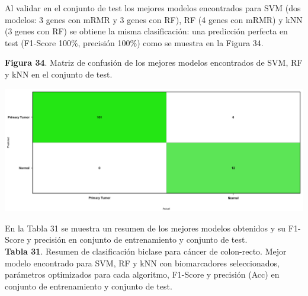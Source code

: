 Al validar en el conjunto de test los mejores modelos encontrados para SVM (dos modelos: 3 genes con mRMR y 3 genes con RF), RF (4 genes con mRMR) y kNN (3 genes con RF) se obtiene la misma clasificación: una predicción perfecta en test (F1-Score 100\%, precisión 100\%) como se muestra en la Figura 34.\\

\newpage
\begin{center}
\textbf{Figura 34}. Matriz de confusión de los mejores modelos encontrados de SVM, RF y kNN en el conjunto de test.
\end{center}

\begin{center}
	\includegraphics[width=1\textwidth]{figuras/34_cr_biclase_18_svm_matriz_confusion_mejor_metodo.png} 
\end{center}

En la Tabla 31 se muestra un resumen de los mejores modelos obtenidos y su F1-Score y precisión en conjunto de entrenamiento y conjunto de test.\\

\textbf{Tabla 31}. Resumen de clasificación biclase para cáncer de colon-recto. Mejor modelo encontrado para SVM, RF y kNN con biomarcadores seleccionados, parámetros optimizados para cada algoritmo, F1-Score y precisión (Acc) en conjunto de entrenamiento y conjunto de test.

